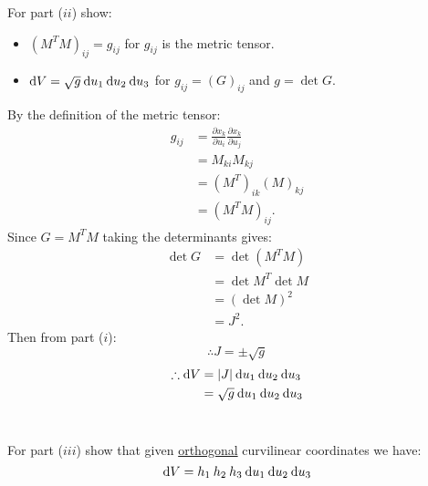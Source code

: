 \begin{enumerate}
    \newpage

    For part ($ii$) show:
    \begin{itemize}
        \item $(M^T M)_{ij}=g_{ij}$ for $g_{ij}$ is the metric tensor.

        \item $\dd V=\sqrt{g}\hspace{0.03in}\dd u_1\hspace{0.03in}\dd u_2\hspace{0.03in}\dd u_3$
        for $g_{ij}=(G)_{ij}$ and $g=\det G$. \\
    \end{itemize}

    By the definition of the metric tensor:
    \begin{align*}
        g_{ij}
        &=\frac{\partial x_k}{\partial u_i}
        \frac{\partial x_k}{\partial u_j} \\
        &=M_{ki}M_{kj} \\
        &=(M^T)_{ik}(M)_{kj} \\
        &=(M^T M)_{ij}.
    \end{align*}
    Since $G=M^T M$ taking the determinants gives:
    \begin{align*}
        \det G
        &=\det (M^T M) \\
        &=\det M^T\det M \\
        &=(\det M)^2 \\
        &=J^2.
    \end{align*}
    Then from part ($i$):
    $$\therefore J=\pm\sqrt{g}$$
    \begin{align*}
        \therefore\dd V
        &=|J|\hspace{0.03in}\dd u_1\hspace{0.03in}\dd u_2\hspace{0.03in}\dd u_3 \\
        &=\sqrt{g}\hspace{0.03in}\dd u_1\hspace{0.03in}\dd u_2\hspace{0.03in}\dd u_3
    \end{align*} \\

    \newpage
    
    For part ($iii$) show that given \underline{orthogonal} curvilinear coordinates we have:
    $$\dd V=h_1\hspace{0.03in}h_2\hspace{0.03in}h_3
    \hspace{0.03in}\dd u_1\hspace{0.03in}\dd u_2\hspace{0.03in}\dd u_3$$ \\


\end{enumerate}
